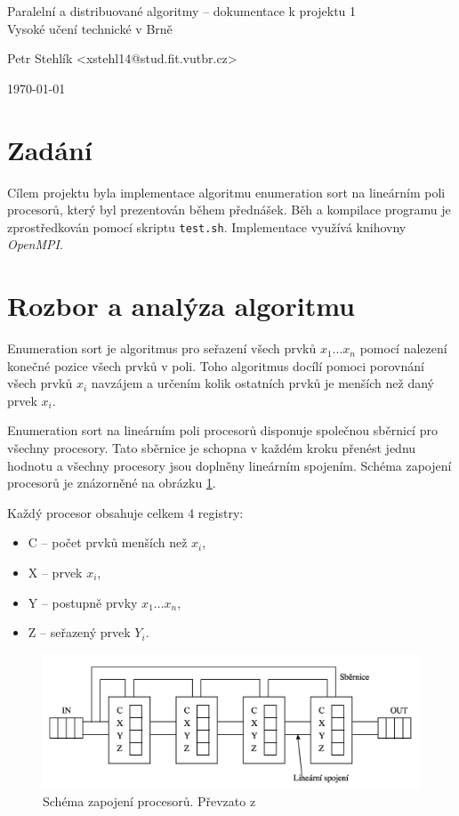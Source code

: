 \documentclass[11pt,a4paper]{article}
\begin{document}
\begin{center}
	\LARGE{Paralelní a distribuované algoritmy -- dokumentace k projektu 1}\\
	\large{Vysoké učení technické v Brně}
	\vspace{0.5cm}

	Petr Stehlík <xstehl14@stud.fit.vutbr.cz>

	\vspace{0.2cm}

	\today

\end{center}

\section{Zadání}

Cílem projektu byla implementace algoritmu enumeration sort na lineárním poli procesorů, který byl prezentován během přednášek. Běh a kompilace programu je zprostředkován pomocí skriptu \texttt{test.sh}. Implementace využívá knihovny \textit{OpenMPI}.


\section{Rozbor a analýza algoritmu}

Enumeration sort je algoritmus pro seřazení všech prvků $x_1...x_n$ pomocí nalezení konečné pozice všech prvků v poli. Toho algoritmus docílí pomoci porovnání všech prvků $x_i$ navzájem a určením kolik ostatních prvků je menších než daný prvek $x_i$.

Enumeration sort na lineárním poli procesorů disponuje společnou sběrnicí pro všechny procesory. Tato sběrnice je schopna v každém kroku přenést jednu hodnotu a všechny procesory jsou doplněny lineárním spojením. Schéma zapojení procesorů je znázorněné na obrázku \ref{schema}.

Každý procesor obsahuje celkem 4 registry:
\begin{itemize}
    \item{C -- počet prvků menších než $x_i$},
    \item{X -- prvek $x_i$},
    \item{Y -- postupně prvky $x_1 ... x_n$},
    \item{Z -- seřazený prvek $Y_i$}.
\end{itemize}

\begin{figure}[!ht]
    \includegraphics[width=1\linewidth]{schema}
    \centering
    \caption{Schéma zapojení procesorů. Převzato z \cite{bib:schema}}
    \label{schema}
\end{figure}
\end{document}
